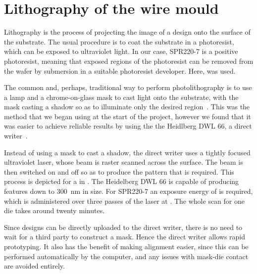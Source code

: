\section{Lithography of the wire mould}

Lithography is the process of projecting the image of a design onto the surface
of the substrate. The usual procedure is to coat the substrate in a
photoresist, which can be exposed to ultraviolet light. In our case, SPR220-7
is a positive photoresist, meaning that exposed regions of the
photoresist can be removed from the wafer by submersion in a suitable
photoresist developer. Here,  was used. 

The common and, perhaps, traditional way to perform photolithography is to use
a  lamp and a chrome-on-glass mask to cast light onto the
substrate, with the mask casting a shadow so as to illuminate only the desired
region~\cite{Madou2002}. This was the method that we began using at the start of the
project, however we found that it was easier to achieve reliable results by
using the the Heidlberg DWL 66, a direct writer~\cite{}. 

Instead of using a mask to cast a shadow, the direct writer uses a tightly
focused ultraviolet laser, whose beam is raster scanned across the surface. The
beam is then switched on and off so as to produce the pattern that is required.
This process is depicted for a in . The Heidelberg
DWL 66 is capable of producing features down to \SI{300}{\nano\meter} in size.
For SPR220-7 an exposure energy of  is required, which is administered
over three passes of the laser at . The whole scan for one die
takes around twenty minutes.

Since designs can be directly uploaded to the direct writer, there is no need
to wait for a third party to construct a mask.  Hence the direct writer allows
rapid prototyping. It also has the benefit of making alignment easier, since
this can be performed automatically by the computer, and any issues with
mask-die contact are avoided entirely.


